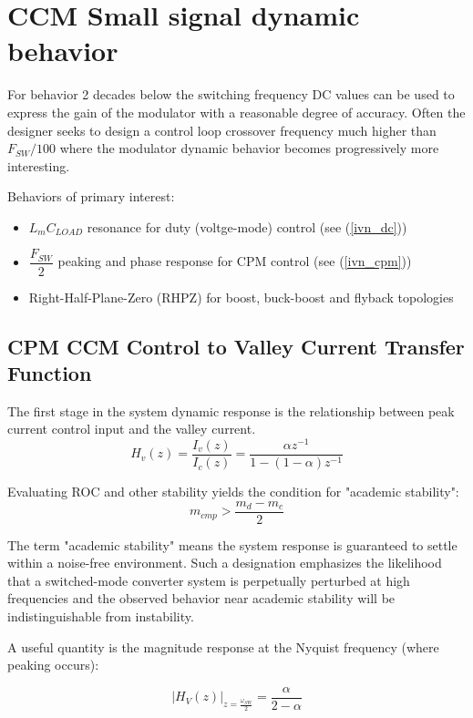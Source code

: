 \documentclass{scrartcl}
\begin{document}
	\section{CCM Small signal dynamic behavior}
	For behavior 2 decades below the switching frequency DC values can be used to express the gain of the modulator with a reasonable degree of accuracy.  Often the designer seeks to design a control loop crossover frequency much higher than $F_{SW}/100$ where the modulator dynamic behavior becomes progressively more interesting. 
	
	Behaviors of primary interest:
	\begin{itemize}
		\item $L_m C_{LOAD}$ resonance for duty (voltge-mode) control (see (\ref{ivn_dc}))
		\item $\dfrac{F_{SW}}{2}$ peaking and phase response for CPM control (see (\ref{ivn_cpm}))
		\item Right-Half-Plane-Zero (RHPZ) for boost, buck-boost and flyback topologies 
	\end{itemize}
	
		\subsection{CPM CCM Control to Valley Current Transfer Function}
		The first stage in the system dynamic response is the relationship between peak current control input and the valley current. 
		\begin{equation}
		H_v(z) = \frac {I_v(z)} {I_c(z)} = \frac {\alpha z^{-1}} {1 - (1-\alpha) z^{-1}}  \label{hvz}
		\end{equation}
			
		Evaluating ROC and other stability yields the condition for "academic stability":
		\begin{equation}
		m_{cmp} > \dfrac{m_d - m_c}{2} \label{slope_stab}
		\end{equation}
		
		The term "academic stability" means the system response is guaranteed to settle within a noise-free environment.  Such a designation emphasizes the likelihood that a switched-mode converter system is perpetually perturbed at high frequencies and the observed behavior near academic stability will be indistinguishable from instability.
		
		A useful quantity is the magnitude response at the Nyquist frequency (where peaking occurs):		
		
		\begin{equation}
		\bigg|H_V(z) \bigg|_{z=\frac{\omega_{SW}}{2}} =  \dfrac{\alpha}{2 - \alpha} \label{cpm_peaking}
		\end{equation}
		
\end{document}
